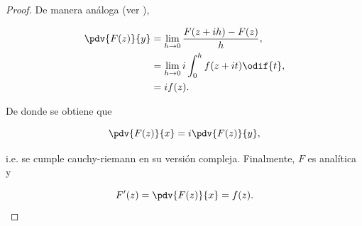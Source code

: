 \documentclass[../main.tex]{subfiles}
\begin{document}
\begin{proof}
    De manera análoga (ver ),

    \begin{align*}
        \pdv{F(z)}{y} &= \lim_{h\to 0}\dfrac{F(z + ih) - F(z)}{h},\\
        &= \lim_{h\to 0}i \int_{0}^{h}f(z + it)\odif{t},\\
        &= i f(z).
    \end{align*}

    De donde se obtiene que

    \begin{equation*}
        \pdv{F(z)}{x} = i \pdv{F(z)}{y},
    \end{equation*}

    i.e. se cumple cauchy-riemann en su versión compleja. Finalmente, \(F\)
    es analítica y

    \begin{equation*}
        F^{\prime}(z) = \pdv{F(z)}{x} = f(z).
    \end{equation*}
\end{proof}
\end{document}

